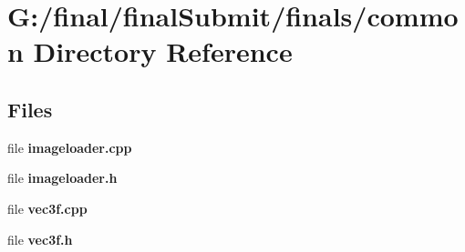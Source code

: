 \section{G\-:/final/final\-Submit/finals/common Directory Reference}
\label{dir_7f856b4149901e0096d7dddd0ba6d837}
\subsection*{Files}
\begin{DoxyCompactItemize}
\item 
file {\bf imageloader.\-cpp}
\item 
file {\bf imageloader.\-h}
\item 
file {\bf vec3f.\-cpp}
\item 
file {\bf vec3f.\-h}
\end{DoxyCompactItemize}
